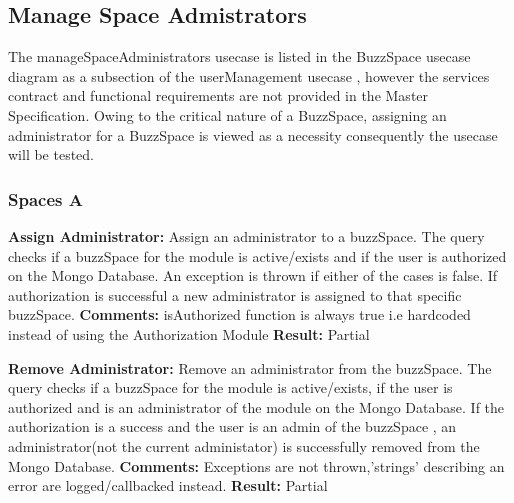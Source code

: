 
\subsection{ Manage Space Admistrators}

The manageSpaceAdministrators usecase is listed in the BuzzSpace usecase diagram as a subsection of the userManagement usecase , \newline 
however the services contract and functional requirements are not provided in the Master Specification. \newline
Owing to the critical nature of a BuzzSpace, assigning an administrator for a BuzzSpace is viewed as a necessity \newline
consequently the usecase will be tested.

\subsubsection{Spaces A}
\textbf{Assign Administrator:} Assign an administrator to a buzzSpace. \newline
The query checks if a buzzSpace for the module is active/exists and if the user is authorized on the Mongo Database.\newline
An exception is thrown if either of the cases is false. If authorization is successful a new administrator\newline
is assigned to that specific buzzSpace.\newline
\textbf{Comments:} isAuthorized function is always true i.e hardcoded instead of using the Authorization Module  \newline
\textbf{Result:}  Partial \newline

\textbf{Remove  Administrator:} Remove an administrator from the buzzSpace. \newline
The query checks if a buzzSpace for the module is active/exists, if the user is authorized and is an administrator of the module on the Mongo Database.\newline
If the authorization is a success and the user is an admin of the buzzSpace , an administrator(not the current administator) \newline
is successfully removed from the Mongo Database. \newline
\textbf{Comments:} Exceptions are not thrown,'strings' describing an error are logged/callbacked instead. \newline
\textbf{Result:}  Partial \newline

